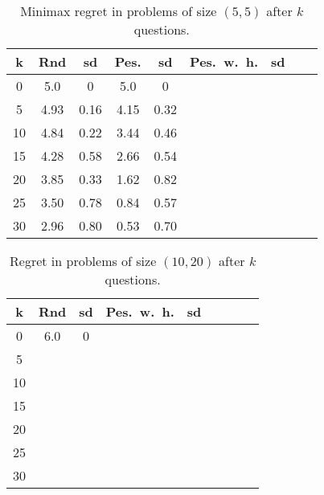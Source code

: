 \begin{table}
	\begin{center}
		\begin{tabular}{S[table-figures-integer=2, table-number-alignment = right, table-figures-decimal=0]S[table-number-alignment = right]@{ ± }S[table-number-alignment = left]S[table-number-alignment = right]@{ ± }S[table-number-alignment = left]S[table-number-alignment = right]@{ ± }S[table-number-alignment = left]S[table-number-alignment = right]@{ ± }S[table-number-alignment = left]}
			\toprule
			{k} & {Rnd} & {sd} & {Pes.} & {sd} & {Pes.\ w.\ h.} & {sd} \\
			 & 5.0 & 0 & 5.0 & 0\\
			5 & 4.93 & 0.16 & 4.15 & 0.32\\
			10 & 4.84 & 0.22 & 3.44 & 0.46\\
			15 & 4.28 & 0.58 & 2.66 &0.54 \\
			20 & 3.85 & 0.33 & 1.62 & 0.82\\
			25 & 3.50 & 0.78 & 0.84 &  0.57\\
			30 & 2.96 & 0.80 & 0.53 & 0.70\\
			\bottomrule
		\end{tabular}
	\end{center}
	\caption{Minimax regret in problems of size $(5, 5)$ after $k$ questions.}
	\label{fig:55}
\end{table}

\begin{table}
	\begin{center}
		\begin{tabular}{S[table-figures-integer=2, table-number-alignment = right, table-figures-decimal=0]S[table-number-alignment = right]@{ ± }S[table-number-alignment = left]S[table-number-alignment = right]@{ ± }S[table-number-alignment = left]S[table-number-alignment = right]@{ ± }S[table-number-alignment = left]S[table-number-alignment = right]@{ ± }S[table-number-alignment = left]}
			\toprule
			{k} & {Rnd} & {sd} & {Pes.\ w.\ h.} & {sd} \\
			 & 6.0 & 0 &  &  \\
			5 &  &  &  &  \\
			10 &  &  &  &  \\
			15 &  &  &  &  \\
			20 &  &  &  &  \\
			25 &  &  &  &  \\
			30 &  &  &  &  \\
			\bottomrule
		\end{tabular}
	\end{center}
	\caption{Regret in problems of size $(10, 20)$ after $k$ questions.}
	\label{fig:1020}
\end{table}

